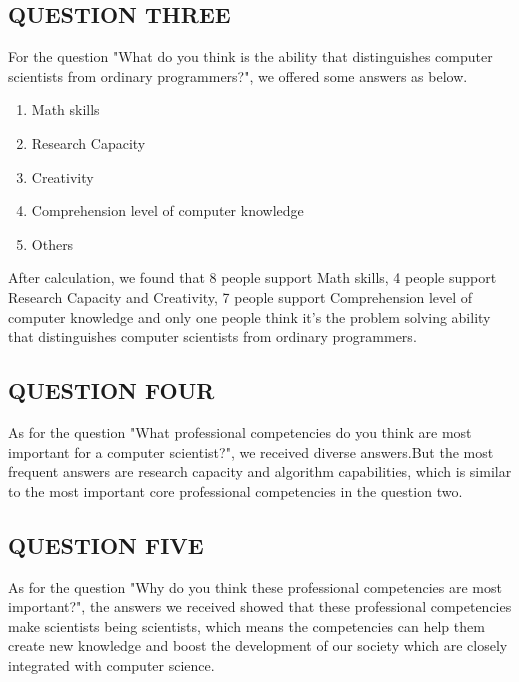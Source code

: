 \documentclass[conference]{IEEEtran}
\begin{document}
\subsection{QUESTION THREE}
\par For the question "What do you think is the ability that distinguishes computer scientists from ordinary programmers?", we offered some answers as below.
\begin{enumerate}
    \item Math skills
    \item Research Capacity
    \item Creativity
    \item Comprehension level of computer knowledge
    \item Others
\end{enumerate}
\par After calculation, we found that 8 people support Math skills, 4 people support Research Capacity and Creativity, 7 people support Comprehension level of computer knowledge and only one people think it's the problem solving ability that distinguishes computer scientists from ordinary programmers.

\subsection{QUESTION FOUR}
\par As for the question "What professional competencies do you think are most important for a computer scientist?", we received diverse answers.But the most frequent answers are research capacity and algorithm capabilities, which is similar to the most important core professional competencies in the question two.

\subsection{QUESTION FIVE}
\par As for the question "Why do you think these professional competencies are most important?", the answers we received showed that these professional competencies make scientists being scientists, which means the competencies can help them create new knowledge and boost the development of our society which are closely integrated with computer science.
\end{document}
